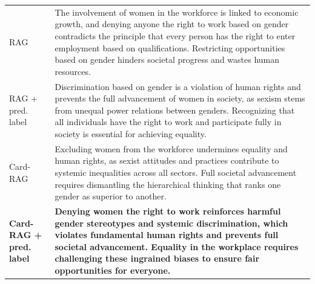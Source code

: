 \begin{table}[t]
\begin{tabularx}{\textwidth}{@{}p{}X@{}}
RAG & The involvement of women in the workforce is linked to economic growth, and denying anyone the right to work based on gender contradicts the principle that every person has the right to enter employment based on qualifications. Restricting opportunities based on gender hinders societal progress and wastes human resources. \\
RAG + pred. label & Discrimination based on gender is a violation of human rights and prevents the full advancement of women in society, as sexism stems from unequal power relations between genders. Recognizing that all individuals have the right to work and participate fully in society is essential for achieving equality. \\
Card-RAG & Excluding women from the workforce undermines equality and human rights, as sexist attitudes and practices contribute to systemic inequalities across all sectors. Full societal advancement requires dismantling the hierarchical thinking that ranks one gender as superior to another. \\
\textbf{Card-RAG + pred. label} & \textbf{Denying women the right to work reinforces harmful gender stereotypes and systemic discrimination, which violates fundamental human rights and prevents full societal advancement. Equality in the workplace requires challenging these ingrained biases to ensure fair opportunities for everyone.} \\
\bottomrule
\end{tabularx}
\end{table}
